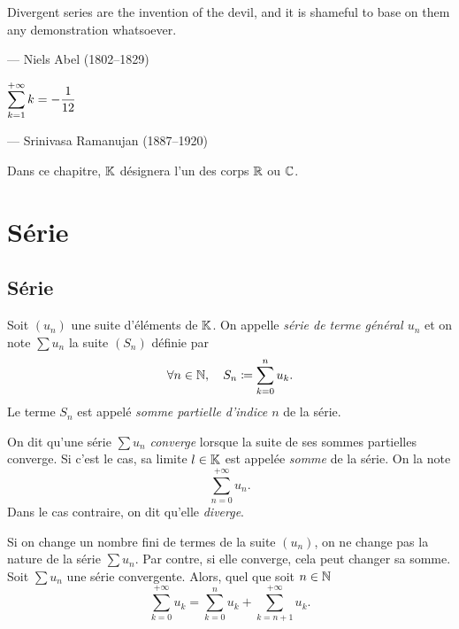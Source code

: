 \documentclass{magnolia}
\begin{document}
\setlength{}
\epigraph{\og Divergent series are the invention of the devil, and it is shameful to base on them any demonstration whatsoever. \fg}{--- {\sc Niels Abel (1802--1829)}}

\setlength{}
\epigraph{$\displaystyle \sum_{k=1}^{+\infty} k=-\frac{1}{12}$}{--- {\sc Srinivasa Ramanujan (1887--1920)}}

\magtoc
\vspace{2ex}
Dans ce chapitre, $\mathbb{K}$ désignera l'un des corps $\mathbb{R}$ ou $\mathbb{C}$.

\section{Série}
\subsection{Série}

\begin{definition}
Soit $(u_n)$ une suite d'éléments de $\mathbb{K}$. On appelle \emph{série de terme général $u_n$}
et on note $\sum u_n$ la suite $(S_n)$ définie par
\[\forall n\in\mathbb{N},\quad S_n\coloneqq \sum_{k=0}^n u_k.\]
Le terme $S_n$ est appelé \emph{somme partielle d'indice $n$} de la série.
\end{definition}


\begin{definition}
On dit qu'une série $\sum u_n$ \emph{converge} lorsque la suite de ses sommes partielles
converge. Si c'est le cas, sa limite $l\in\mathbb{K}$ est appelée \emph{somme} de la série. On
la note
\[\sum_{n=0}^{+\infty} u_n.\]
Dans le cas contraire, on dit qu'elle \emph{diverge}.
\end{definition}

\begin{remarques}
\remarque Si on change un nombre fini de termes de la suite $(u_n)$, on ne change pas
  la nature de la série $\sum u_n$. Par contre, si elle converge, cela peut changer sa somme.
\remarque Soit $\sum u_n$ une série convergente. Alors, quel que soit $n\in\mathbb{N}$
  \[\sum_{k=0}^{+\infty} u_k=\sum_{k=0}^n u_k + \sum_{k=n+1}^{+\infty} u_k.\]
\end{remarques}
\end{document}
